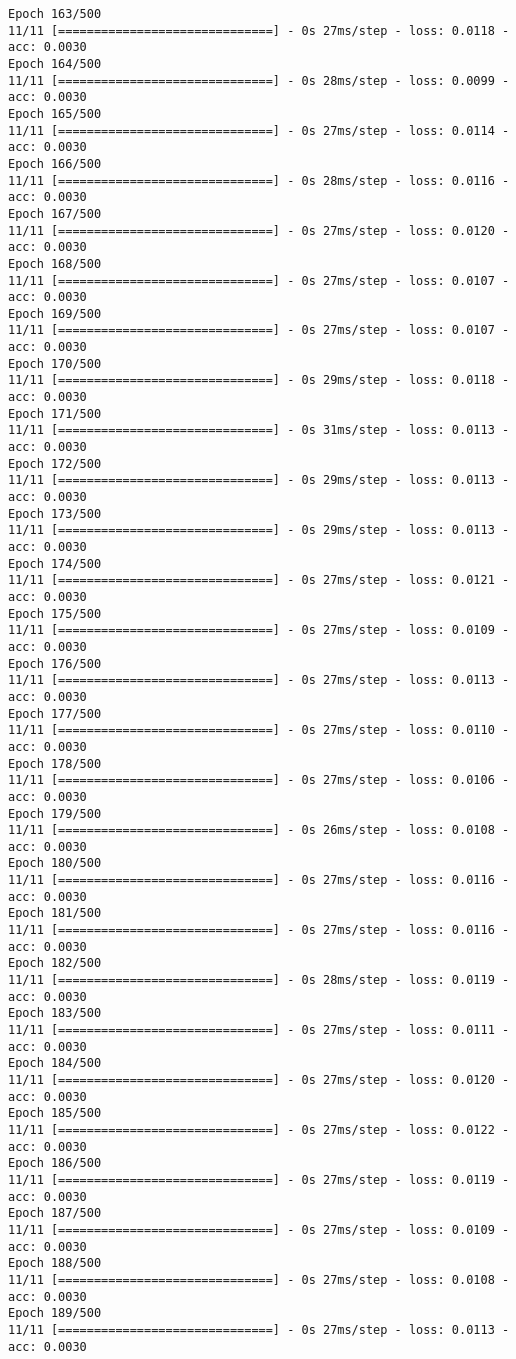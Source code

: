 \documentclass[11pt]{article}
\begin{document}
\begin{Verbatim}[commandchars=\\\{\}]
Epoch 163/500
11/11 [==============================] - 0s 27ms/step - loss: 0.0118 - acc: 0.0030
Epoch 164/500
11/11 [==============================] - 0s 28ms/step - loss: 0.0099 - acc: 0.0030
Epoch 165/500
11/11 [==============================] - 0s 27ms/step - loss: 0.0114 - acc: 0.0030
Epoch 166/500
11/11 [==============================] - 0s 28ms/step - loss: 0.0116 - acc: 0.0030
Epoch 167/500
11/11 [==============================] - 0s 27ms/step - loss: 0.0120 - acc: 0.0030
Epoch 168/500
11/11 [==============================] - 0s 27ms/step - loss: 0.0107 - acc: 0.0030
Epoch 169/500
11/11 [==============================] - 0s 27ms/step - loss: 0.0107 - acc: 0.0030
Epoch 170/500
11/11 [==============================] - 0s 29ms/step - loss: 0.0118 - acc: 0.0030
Epoch 171/500
11/11 [==============================] - 0s 31ms/step - loss: 0.0113 - acc: 0.0030
Epoch 172/500
11/11 [==============================] - 0s 29ms/step - loss: 0.0113 - acc: 0.0030
Epoch 173/500
11/11 [==============================] - 0s 29ms/step - loss: 0.0113 - acc: 0.0030
Epoch 174/500
11/11 [==============================] - 0s 27ms/step - loss: 0.0121 - acc: 0.0030
Epoch 175/500
11/11 [==============================] - 0s 27ms/step - loss: 0.0109 - acc: 0.0030
Epoch 176/500
11/11 [==============================] - 0s 27ms/step - loss: 0.0113 - acc: 0.0030
Epoch 177/500
11/11 [==============================] - 0s 27ms/step - loss: 0.0110 - acc: 0.0030
Epoch 178/500
11/11 [==============================] - 0s 27ms/step - loss: 0.0106 - acc: 0.0030
Epoch 179/500
11/11 [==============================] - 0s 26ms/step - loss: 0.0108 - acc: 0.0030
Epoch 180/500
11/11 [==============================] - 0s 27ms/step - loss: 0.0116 - acc: 0.0030
Epoch 181/500
11/11 [==============================] - 0s 27ms/step - loss: 0.0116 - acc: 0.0030
Epoch 182/500
11/11 [==============================] - 0s 28ms/step - loss: 0.0119 - acc: 0.0030
Epoch 183/500
11/11 [==============================] - 0s 27ms/step - loss: 0.0111 - acc: 0.0030
Epoch 184/500
11/11 [==============================] - 0s 27ms/step - loss: 0.0120 - acc: 0.0030
Epoch 185/500
11/11 [==============================] - 0s 27ms/step - loss: 0.0122 - acc: 0.0030
Epoch 186/500
11/11 [==============================] - 0s 27ms/step - loss: 0.0119 - acc: 0.0030
Epoch 187/500
11/11 [==============================] - 0s 27ms/step - loss: 0.0109 - acc: 0.0030
Epoch 188/500
11/11 [==============================] - 0s 27ms/step - loss: 0.0108 - acc: 0.0030
Epoch 189/500
11/11 [==============================] - 0s 27ms/step - loss: 0.0113 - acc: 0.0030

\end{Verbatim}
\end{document}
